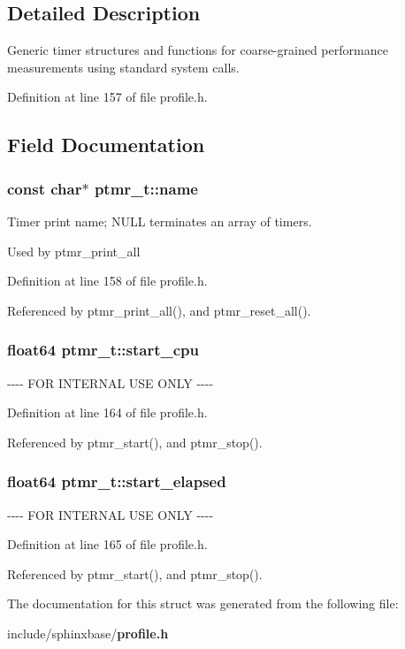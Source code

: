 \subsection{\-Detailed \-Description}
\-Generic timer structures and functions for coarse-\/grained performance measurements using standard system calls. 

\-Definition at line 157 of file profile.\-h.



\subsection{\-Field \-Documentation}
\subsubsection[{name}]{\setlength{\rightskip}{0pt plus 5cm}const char$\ast$ {\bf ptmr\-\_\-t\-::name}}\label{structptmr__t_a73b51c5a047300d77b3a82a7dcaf44f1}


\-Timer print name; \-N\-U\-L\-L terminates an array of timers. 

\-Used by ptmr\-\_\-print\-\_\-all 

\-Definition at line 158 of file profile.\-h.



\-Referenced by ptmr\-\_\-print\-\_\-all(), and ptmr\-\_\-reset\-\_\-all().

\subsubsection[{start\-\_\-cpu}]{\setlength{\rightskip}{0pt plus 5cm}float64 {\bf ptmr\-\_\-t\-::start\-\_\-cpu}}\label{structptmr__t_a85c0c5f0e321cf11fb478b92a05223e8}
-\/-\/-\/-\/ \-F\-O\-R \-I\-N\-T\-E\-R\-N\-A\-L \-U\-S\-E \-O\-N\-L\-Y -\/-\/-\/-\/ 

\-Definition at line 164 of file profile.\-h.



\-Referenced by ptmr\-\_\-start(), and ptmr\-\_\-stop().

\subsubsection[{start\-\_\-elapsed}]{\setlength{\rightskip}{0pt plus 5cm}float64 {\bf ptmr\-\_\-t\-::start\-\_\-elapsed}}\label{structptmr__t_a1702b16a6c6bcb82f6c636f5e68af188}
-\/-\/-\/-\/ \-F\-O\-R \-I\-N\-T\-E\-R\-N\-A\-L \-U\-S\-E \-O\-N\-L\-Y -\/-\/-\/-\/ 

\-Definition at line 165 of file profile.\-h.



\-Referenced by ptmr\-\_\-start(), and ptmr\-\_\-stop().



\-The documentation for this struct was generated from the following file\-:\begin{DoxyCompactItemize}
\item 
include/sphinxbase/{\bf profile.\-h}\end{DoxyCompactItemize}
